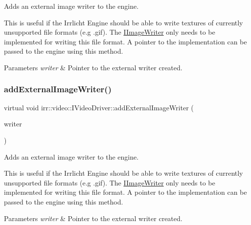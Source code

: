 Adds an external image writer to the engine. 

This is useful if the Irrlicht Engine should be able to write textures of currently unsupported file formats (e.\+g .gif). The \hyperlink{classirr_1_1video_1_1IImageWriter}{I\+Image\+Writer} only needs to be implemented for writing this file format. A pointer to the implementation can be passed to the engine using this method. 
\begin{DoxyParams}{Parameters}
{\em writer} & Pointer to the external writer created. \\
\hline
\end{DoxyParams}
\mbox{\label{classirr_1_1video_1_1IVideoDriver_a56160e0d88346e04db921fbe4635a7ae}} 
\subsubsection{\texorpdfstring{add\+External\+Image\+Writer()}{addExternalImageWriter()}\hspace{0.1cm}{\footnotesize\ttfamily [2/2]}}
{\footnotesize\ttfamily virtual void irr\+::video\+::\+I\+Video\+Driver\+::add\+External\+Image\+Writer (\begin{DoxyParamCaption}\item[{\hyperlink{classirr_1_1video_1_1IImageWriter}{I\+Image\+Writer} $\ast$}]{writer }\end{DoxyParamCaption})\hspace{0.3cm}{\ttfamily [pure virtual]}}



Adds an external image writer to the engine. 

This is useful if the Irrlicht Engine should be able to write textures of currently unsupported file formats (e.\+g .gif). The \hyperlink{classirr_1_1video_1_1IImageWriter}{I\+Image\+Writer} only needs to be implemented for writing this file format. A pointer to the implementation can be passed to the engine using this method. 
\begin{DoxyParams}{Parameters}
{\em writer} & Pointer to the external writer created. \\
\hline
\end{DoxyParams}
\mbox{\label{classirr_1_1video_1_1IVideoDriver_a0dfc3a7168f3a73a6f4323b579f03ff6}} 
